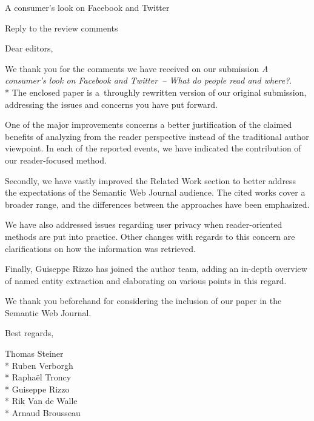 \documentclass{letter}
\begin{document}
{\huge A consumer's look on Facebook and Twitter}

{\LARGE Reply to the review comments}

\vspace{5em}

Dear editors,

We thank you for the comments we have received on our submission \emph{A consumer's look on Facebook and Twitter~-- What do people read and where?}.
\\*
The enclosed paper is a~throughly rewritten version of our original submission,
addressing the issues and concerns you have put forward.

One of the major improvements concerns a better justification of the claimed benefits of analyzing from the reader perspective instead of the traditional author viewpoint.
In each of the reported events, we have indicated the contribution of our reader-focused method.

Secondly, we have vastly improved the Related Work section to better address the expectations of the Semantic Web Journal audience.
The cited works cover a broader range, and the differences between the approaches have been emphasized.

We have also addressed issues regarding user privacy when reader-oriented methods are put into practice.
Other changes with regards to this concern are clarifications on how the information was retrieved.

Finally, Guiseppe Rizzo has joined the author team, adding an in-depth overview of named entity extraction and elaborating on various points in this regard.

We thank you beforehand for considering the inclusion of our paper in the Semantic Web Journal.

Best regards,

Thomas Steiner\\*
Ruben Verborgh\\*
Raphaël Troncy\\*
Guiseppe Rizzo\\*
Rik Van de Walle\\*
Arnaud Brousseau
\end{document}
